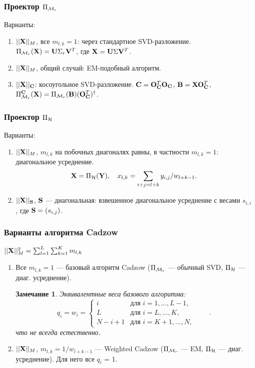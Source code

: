 \documentclass[unicode, notheorems]{beamer}
\newtheorem{thnote}{Замечание}
\begin{document}
\begin{frame}
    \frametitle{Проектор $\Pi_{\mathcal{M}_r}$}
    Варианты:
    \begin{enumerate}
    \item $||\mathbf{X}||_M$, все $m_{l, k} = 1$: через стандартное SVD-разложение. $\Pi_{\mathcal{M}_r}(\mathbf{X}) = \mathbf{U} \Sigma_r \mathbf{V}^T$, где $\mathbf{X} = \mathbf{U} \Sigma \mathbf{V}^T$.
    \vspace{0.2cm}
    \item $||\mathbf{X}||_M$, общий случай: EM-подобный алгоритм.
    \vspace{0.2cm}
    \item $||\mathbf{X}||_{\mathbf{C}}$: косоугольное SVD-разложение. $\mathbf{C} = \mathbf{O}_{\mathbf{C}}^T \mathbf{O}_{\mathbf{C}}$, $\mathbf{B} = \mathbf{X} \mathbf{O}_{\mathbf{C}}^T$, $\Pi_{\mathcal{M}_r}^{\mathbf{C}}(\mathbf{X}) = \Pi_{\mathcal{M}_r}(\mathbf{B})(\mathbf{O}_{\mathbf{C}}^T)^\dagger$.
    \end{enumerate}
\end{frame}

\begin{frame}
    \frametitle{Проектор $\Pi_{\mathcal{H}}$}
    Варианты:
    \begin{enumerate}
    \item $||\mathbf{X}||_M$, $m_{l,k}$ на побочных диагоналях равны, в частности $m_{l, k} = 1$: диагональное усреднение.
    \begin{equation*}
    \mathbf{X} = \Pi_{\mathcal{H}}(\mathbf{Y}), \quad x_{l,k} = \sum_{i + j = l + k} y_{i, j} / w_{l + k - 1}.
    \end{equation*}
    \item $||\mathbf{X}||_{\mathbf{S}}$, $\mathbf{S}$ --- диагональная: взвешенное диагональное усреднение с весами $s_{i, i}$, где $\mathbf{S} = (s_{i, j})$.
    \end{enumerate}
\end{frame}

\begin{frame}
    \frametitle{Варианты алгоритма Cadzow}
     $||\mathbf{X}||^2_M =  \sum_{l = 1}^L \sum_{k = 1}^K m_{l, k}$
    \begin{enumerate}
    \item Все $m_{l, k} = 1$ --- базовый алгоритм Cadzow ($\Pi_{\mathcal{M}_r}$ --- обычный SVD, $\Pi_{\mathcal{H}}$ --- диаг. усреднение).
    \begin{thnote}
    Эквивалентные веса базового алгоритма:
    \begin{equation*}
q_i = w_i = \begin{cases}
i & \text{для $i = 1, \ldots, L-1,$}\\
L & \text{для $i = L, \ldots, K,$}\\
N - i + 1 & \text{для $i = K + 1, \ldots, N,$}
\end{cases} \qquad.
\end{equation*}
что не всегда естественно.
    \end{thnote}
    \item $||\mathbf{X}||_M$, $m_{l, k} = 1 / w_{l + k - 1}$ --- Weighted Cadzow ($\Pi_{\mathcal{M}_r}$ --- EM, $\Pi_{\mathcal{H}}$ --- диаг. усреднение). Для него все $q_i$ = 1.
    \end{enumerate}
\end{frame}
\end{document}
